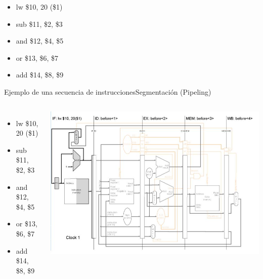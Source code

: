 \documentclass[aspectratio=169,compress]{beamer}
\begin{document}
\begin{footnotesize}
\begin{frame}
\begin{itemize}
\item lw \$10, 20 (\$1)
\item sub \$11, \$2, \$3
\item and \$12, \$4, \$5
\item or \$13, \$6, \$7
\item add \$14, \$8, \$9
\end{itemize}

\end{frame}








\begin{frame}{Ejemplo de una secuencia de instrucciones}{Segmentación (Pipeling)}

 \begin{columns}[onlytextwidth,T]
      \column{\dimexpr\linewidth-110mm-5mm}

\bigskip
\begin{itemize}
\item lw \$10, 20 (\$1)
\item sub \$11, \$2, \$3
\item and \$12, \$4, \$5
\item or \$13, \$6, \$7
\item add \$14, \$8, \$9
\end{itemize}

      \column{100mm}
\includegraphics[scale=0.35]{images/pipeling1.jpg} 
    \end{columns}

\end{frame}



\end{footnotesize}
\end{document}
